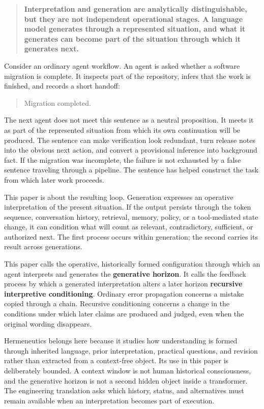 \documentclass[12pt]{article}
\begin{document}
\begin{quote}
\textbf{Interpretation and generation are analytically distinguishable, but they are not independent operational stages. A language model generates through a represented situation, and what it generates can become part of the situation through which it generates next.}
\end{quote}

Consider an ordinary agent workflow. An agent is asked whether a software migration is complete. It inspects part of the repository, infers that the work is finished, and records a short handoff:

\begin{quote}
Migration completed.
\end{quote}

The next agent does not meet this sentence as a neutral proposition. It meets it as part of the represented situation from which its own continuation will be produced. The sentence can make verification look redundant, turn release notes into the obvious next action, and convert a provisional inference into background fact. If the migration was incomplete, the failure is not exhausted by a false sentence traveling through a pipeline. The sentence has helped construct the task from which later work proceeds.

This paper is about the resulting loop. Generation expresses an operative interpretation of the present situation. If the output persists through the token sequence, conversation history, retrieval, memory, policy, or a tool-mediated state change, it can condition what will count as relevant, contradictory, sufficient, or authorized next. The first process occurs within generation; the second carries its result across generations.

This paper calls the operative, historically formed configuration through which an agent interprets and generates the \textbf{generative horizon}. It calls the feedback process by which a generated interpretation alters a later horizon \textbf{recursive interpretive conditioning}. Ordinary error propagation concerns a mistake copied through a chain. Recursive conditioning concerns a change in the conditions under which later claims are produced and judged, even when the original wording disappears.

Hermeneutics belongs here because it studies how understanding is formed through inherited language, prior interpretation, practical questions, and revision rather than extracted from a context-free object. Its use in this paper is deliberately bounded. A context window is not human historical consciousness, and the generative horizon is not a second hidden object inside a transformer. The engineering translation asks which history, status, and alternatives must remain available when an interpretation becomes part of execution.
\end{document}
